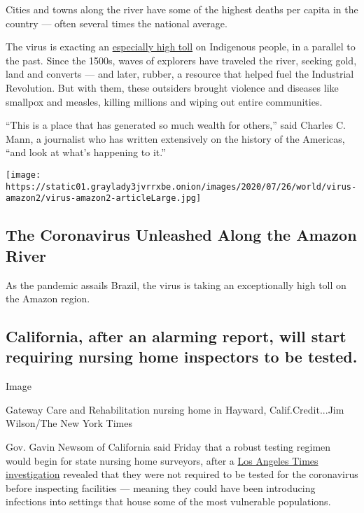 Cities and towns along the river have some of the highest deaths per
capita in the country --- often several times the national average.

The virus is exacting an
\href{https://www.nytimes3xbfgragh.onion/2020/07/19/world/americas/coronavirus-brazil-indigenous.html?smid=tw-share}{especially
high toll} on Indigenous people, in a parallel to the past. Since the
1500s, waves of explorers have traveled the river, seeking gold, land
and converts --- and later, rubber, a resource that helped fuel the
Industrial Revolution. But with them, these outsiders brought violence
and diseases like smallpox and measles, killing millions and wiping out
entire communities.

``This is a place that has generated so much wealth for others,'' said
Charles C. Mann, a journalist who has written extensively on the history
of the Americas, ``and look at what's happening to it.''

\href{https://www.nytimes3xbfgragh.onion/interactive/2020/07/25/world/americas/coronavirus-brazil-amazon.html}{}

\texttt{[image: https://static01.graylady3jvrrxbe.onion/images/2020/07/26/world/virus-amazon2/virus-amazon2-articleLarge.jpg]}

\hypertarget{the-coronavirus-unleashed-along-the-amazon-river}{%
\subsection{The Coronavirus Unleashed Along the Amazon
River}\label{the-coronavirus-unleashed-along-the-amazon-river}}

As the pandemic assails Brazil, the virus is taking an exceptionally
high toll on the Amazon region.

\hypertarget{california-after-an-alarming-report-will-start-requiring-nursing-home-inspectors-to-be-tested}{%
\subsection{California, after an alarming report, will start requiring
nursing home inspectors to be
tested.}\label{california-after-an-alarming-report-will-start-requiring-nursing-home-inspectors-to-be-tested}}

Image

Gateway Care and Rehabilitation nursing home in Hayward,
Calif.Credit...Jim Wilson/The New York Times

Gov. Gavin Newsom of California said Friday that a robust testing
regimen would begin for state nursing home surveyors, after a
\href{https://www.latimes.com/california/story/2020-07-24/california-failure-covid-19-test-nursing-home-inspectors}{Los
Angeles Times investigation} revealed that they were not required to be
tested for the coronavirus before inspecting facilities --- meaning they
could have been introducing infections into settings that house some of
the most vulnerable populations.

